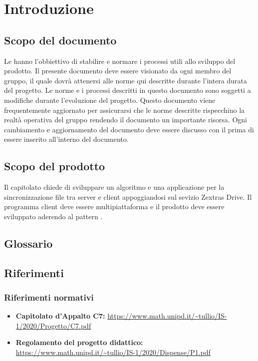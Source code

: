 \section{Introduzione}
\subsection{Scopo del documento}
Le \NdP{} hanno l'obbiettivo di stabilire e normare i processi utili allo sviluppo del prodotto.
Il presente documento deve essere visionato da ogni membro del gruppo, il quale dovrà attenersi alle norme qui descritte durante l'intera durata del progetto.
Le norme e i processi descritti in questo documento sono soggetti a modifiche durante l'evoluzione del progetto.
Questo documento viene frequentemente aggiornato per assicurarsi che le norme descritte rispecchino la realtà operativa del gruppo rendendo il documento un importante risorsa.
Ogni cambiamento e aggiornamento del documento deve essere discusso con il \RdP{} prima di essere inserito all'interno del documento.
\subsection{Scopo del prodotto}
Il capitolato chiede di sviluppare un algoritmo e una applicazione per la sincronizzazione file tra server e client appoggiandosi sul sevizio Zextras Drive.
Il programma client deve essere multipiattaforma e il prodotto deve essere sviluppato aderendo al pattern .
\subsection{Glossario}
\subsection{Riferimenti}
\subsubsection{Riferimenti normativi}
\begin{itemize}
	\item \textbf{Capitolato d'Appalto C7:} \url{https://www.math.unipd.it/~tullio/IS-1/2020/Progetto/C7.pdf}
	\item \textbf{Regolamento del progetto didattico:} \url{https://www.math.unipd.it/~tullio/IS-1/2020/Dispense/P1.pdf}
\end{itemize}
